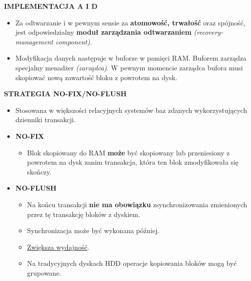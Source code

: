 \textbf{IMPLEMENTACJA A I D}
\begin{itemize}
    \item Za odtwarzanie i w pewnym sensie za \textbf{atomowość, trwałość}
    oraz spójność, jest odpowiedzialny \textbf{moduł zarządzania
    odtwarzaniem} \textit{(recovery-management component).}

    \item Modyfikacja danych następuje w buforze w pamięci RAM. Buforem
    zarządza specjalny menadżer \textit{(zarządca)}.
    W pewnym momencie zarządca bufora musi skopiować nową zawartość
    bloku z powrotem na dysk.
\end{itemize}

\pagebreak

\textbf{STRATEGIA NO-FIX/NO-FLUSH}
\begin{itemize}
    \item Stosowana w większości relacyjnych systemów baz zdanych
    wykorzystujących dzienniki transakcji.

    \item \textbf{NO-FIX}
    \begin{itemize}
        \item Blok skopiowany do RAM \textbf{może} być skopiowany lub
        przeniesiony z powrotem na dysk zanim transakcja, która ten
        blok zmodyfikowała się skończy.
    \end{itemize}

    \item \textbf{NO-FLUSH}
    \begin{itemize}
        \item Na końcu transakcji \textbf{nie ma obowiązku}
        zsynchronizowania zmienionych przez tę transakcję bloków
        z dyskiem.
        \item Synchronizacja może być wykonana później.
        \item \underline{Zwiększa wydajność}.
        \item Na tradycyjnych dyskach HDD operacje kopiowania bloków mogą
        być grupowane.
    \end{itemize}
\end{itemize}

